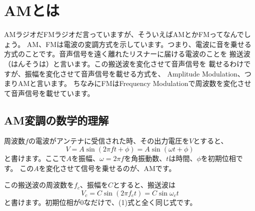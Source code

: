 \chapter*{AMとは}

AMラジオだFMラジオだ言っていますが、そういえばAMとかFMってなんでしょう。
AM、FMは電波の変調方式を示しています。つまり、電波に音を乗せる
方式のことです。音声信号を遠く離れたリスナーに届ける電波のことを
搬送波（はんそうは）と言います。この搬送波を変化させて音声信号を
載せるわけですが、振幅を変化させて音声信号を載せる方式を、
Amplitude Modulation、つまりAMと言います。
ちなみにFMはFrequency Modulationで周波数を変化させて音声信号を載せています。


\section*{AM変調の数学的理解}

周波数$f$の電波がアンテナに受信された時、その出力電圧を$V$とすると、
\begin{equation}
V = A\sin(2 \pi f t + \phi) = A\sin(\omega t + \phi)
\end{equation}
と書けます。ここで$A$を振幅、$\omega=2\pi f$を角振動数、$t$は時間、$\phi$を初期位相です。
この$A$を変化させて信号を乗せるのが、AMです。

この搬送波の周波数を$f_c$、振幅を$C$とすると、搬送波は
\begin{equation}
V_c = C\sin(2 \pi f_c t) = C\sin\omega_c t
\end{equation}
と書けます。初期位相が0なだけで、(1)式と全く同じ式です。

